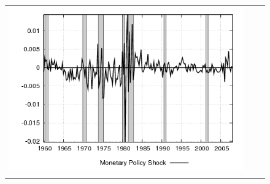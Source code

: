 \begin{figure}
\begin{tabular}{ccc}
\includegraphics[scale=0.3]{results_re/mpshock.png} \\ \\ 
 

\end{tabular}
\end{figure}
